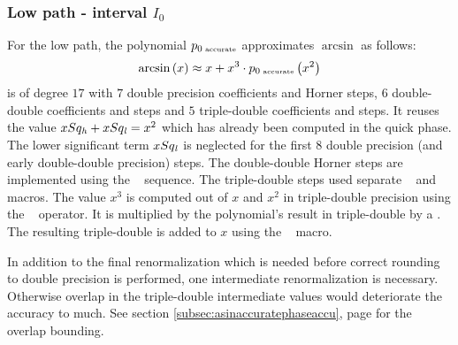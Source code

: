 \subsubsection{Low path - interval $I_0$\label{sec:asinacculowpath}}
For the low path, the polynomial $p_{0\mbox{\tiny ~accurate}}$
approximates $\arcsin$ as follows:
$$\arcsin\left( x \right) \approx x + x^3 \cdot p_{0\mbox{\tiny ~accurate}}\left( x^2 \right)$$
is of degree $17$ with $7$ double precision coefficients and Horner
steps, $6$ double-double coefficients and steps and $5$ triple-double
coefficients and steps. It reuses the value $xSq_{\mathit{h}} + xSq_{\mathit{l}} = x^2$
which has already been computed in the quick phase. The lower
significant term $xSq_{\mathit{l}}$ is neglected for the first $8$ double
precision (and early double-double precision) steps. The double-double
Horner steps are implemented using the \MulAddDD~ sequence. The
triple-double steps used separate \AddTT~ and \MulTT~ macros. The
value $x^3$ is computed out of $x$ and $x^2$ in triple-double
precision using the \MuldDT~ operator. It is multiplied by the
polynomial's result in triple-double by a \MulTT. The resulting
triple-double is added to $x$ using the \AdddTT~ macro.

In addition to the final renormalization which is needed before
correct rounding to double precision is performed, one intermediate
renormalization is necessary. Otherwise overlap in the triple-double
intermediate values would deteriorate the accuracy to much. See
section \ref{subsec:asinaccuratephaseaccu}, page
\pageref{subsec:asinaccuratephaseaccu} for the overlap bounding.

